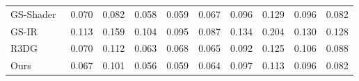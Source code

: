 \begin{table*}[h]
{\begin{tabular}{lccccccccc}
GS-Shader~\cite{jiang2024gaussianshader}    &\cellcolor{yzysecond}0.070                     & \cellcolor{yzybest}0.082                     & \cellcolor{yzythird}0.058                    & \cellcolor{yzybest}0.059                   & \cellcolor{yzythird}0.067                         & \cellcolor{yzythird}0.096                   & 0.129                      & \cellcolor{yzybest}0.096    &  \cellcolor{yzybest}0.082                        \\

GS-IR~\cite{liang2024gs}  & 0.113 & 0.159 & 0.104 & 0.095 & 0.087 & 0.134 & 0.204 & 0.130    & 0.128   \\

R3DG~\cite{gao2023relightable}    &  \cellcolor{yzysecond}0.070                    & 0.112                    &   0.063                 &  \cellcolor{yzysecond}0.068                  &   \cellcolor{yzysecond}0.065                      &  \cellcolor{yzybest}0.092                   &    0.125                  &   0.106  &  \cellcolor{yzythird}0.088                                                                                                                                                                                                                                                                    \\

Ours & \cellcolor{yzybest}0.067                          & \cellcolor{yzysecond}0.101                          & \cellcolor{yzybest}0.056                         & \cellcolor{yzybest}0.059                        & \cellcolor{yzybest}0.064                             & 0.097                       & \cellcolor{yzysecond}0.113                           & \cellcolor{yzybest}0.096  &  \cellcolor{yzybest}0.082                                                                                                                                                                                                 
 \\ \hline
\end{tabular}
}
\label{tab:tab_glossy}
      \vspace{-2ex}
\end{table*}